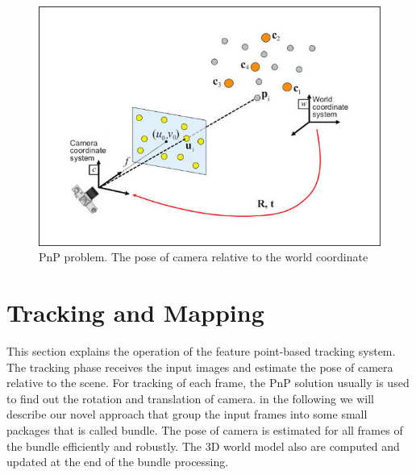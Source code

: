 \begin{figure}[H]
  \centering
  \includegraphics[width=140mm]{figures/pnp}
  \caption{PnP problem. The pose of camera relative to the world coordinate}\label{fig:pnp_sample}
\end{figure}



\section{Tracking and Mapping}
This section explains the operation of the feature point-based tracking system. The tracking phase receives the input images and estimate the pose of camera relative to the scene. For tracking of each frame, the PnP solution usually is used to find out the rotation and translation of camera. in the following we will describe our novel approach that group the input frames into some small packages that is called bundle. The pose of camera is estimated for all frames of the bundle efficiently and robustly. The 3D world model also are computed and updated at the end of the bundle processing.

